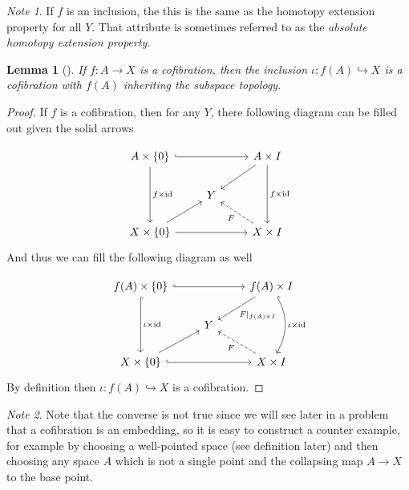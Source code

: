 \documentclass[reqno]{amsart}
\newtheorem{lemma}[theorem]{Lemma}
\theoremstyle{definition}
\theoremstyle{remark}
\newtheorem*{note}{Note}
\newcommand{\id}{{\mathrm{id}}}
\begin{document}
\begin{note}
    If $f$ is an inclusion, the this is the same
    as the homotopy extension property for all $Y$. That attribute
    is sometimes referred to as the 
    \textit{absolute homotopy extension property}.
\end{note}

\begin{lemma}[]\label{Lemma:Cofibration-Inclusion-2}
    If $f \colon A \to X$ is a cofibration, then
    the inclusion  $\iota \colon f(A) \hookrightarrow X$ 
    is a cofibration with $f\left( A \right) $ inheriting
    the subspace topology.
\end{lemma}

\begin{proof}
    If $f$ is a cofibration, then for any $Y$, there
    following diagram can be filled out given the solid arrows

    \begin{equation*}
    \begin{tikzcd}
        A \times \left\{ 0 \right\} \ar[dd, "f \times \id"] 
        \ar[rr, hookrightarrow]
        & & A\times I \ar[dd, "f \times \id"] \ar[dl] \\
            & Y &\\
        X \times \left\{ 0 \right\} \ar[ru]
        \ar[rr]& & X \times I 
        \ar[lu, dashed, "F"]
    \end{tikzcd}
    \end{equation*}
    And thus we can fill the following diagram as well

    \begin{equation*}
    \begin{tikzcd}
        f(A) \times \left\{ 0 \right\} \ar[dd, "\iota \times \id",
        hookrightarrow] 
        \ar[rr, hookrightarrow]
        & & f(A) \times I \ar[dd, "\iota \times \id", 
        hookrightarrow, bend left] \ar[dl, "F|_{f(A) \times I}"] \\
            & Y &\\
        X \times \left\{ 0 \right\} \ar[ru]
        \ar[rr, hookrightarrow]& & X \times I 
        \ar[lu, dashed, "F"]
    \end{tikzcd}
    \end{equation*}
    By definition then $\iota \colon
    f(A) \hookrightarrow X$ is a cofibration.
\end{proof}

\begin{note}
    Note that the converse is not true since
    we will see later in a problem that
    a cofibration is an embedding, so it is
    easy to construct a counter example, for example
    by choosing a well-pointed space (see definition later)
    and then choosing any space
    $A$ which is not a single point and the collapsing map
    $A \to X$ to the base point.
\end{note}
\end{document}
